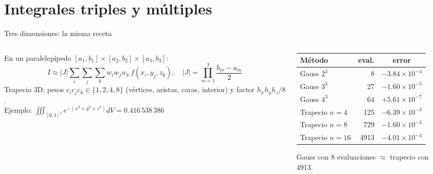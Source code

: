 \documentclass[aspectratio=169,10pt]{beamer}
\begin{document}
\section{Integrales triples y m\'ultiples}
\begin{frame}{Tres dimensiones: la misma receta}
\begin{columns}[T]
\begin{column}{0.52\textwidth}
\small
En un paralelep\'ipedo $[a_1,b_1]\times[a_2,b_2]\times[a_3,b_3]$:
\[
I\approx|J|\sum_{i}\sum_{j}\sum_{k}w_iw_jw_k\,f(x_i,y_j,z_k),\quad |J|=\prod_{m=1}^{3}\frac{b_m-a_m}{2}
\]
Trapecio 3D: pesos $c_ic_jc_k\in\{1,2,4,8\}$ (v\'ertices, aristas, caras, interior) y factor $h_xh_yh_z/8$.\\[4pt]
Ejemplo: $\displaystyle\iiint_{[0,1]^3}e^{-(x^2+y^2+z^2)}dV=0.416\,538\,386$
\end{column}
\begin{column}{0.44\textwidth}
\centering\small
\begin{tabular}{@{}lrc@{}}
\toprule
M\'etodo & eval. & error\\
\midrule
Gauss $2^3$ & 8 & $-3.84\times10^{-4}$\\
Gauss $3^3$ & 27 & $-1.60\times10^{-5}$\\
Gauss $4^3$ & 64 & $+5.61\times10^{-7}$\\
\midrule
Trapecio $n=4$ & 125 & $-6.39\times10^{-3}$\\
Trapecio $n=8$ & 729 & $-1.60\times10^{-3}$\\
Trapecio $n=16$ & 4913 & $-4.01\times10^{-4}$\\
\bottomrule
\end{tabular}
\par\smallskip\footnotesize Gauss con 8 evaluaciones $\approx$ trapecio con 4913.
\end{column}
\end{columns}
\end{frame}
\end{document}
